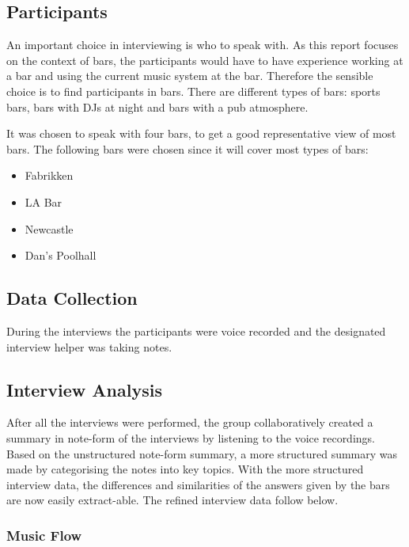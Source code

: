 \subsection{Participants}

An important choice in interviewing is who to speak with. As this report focuses on the context of bars, the participants would have to have experience working at a bar and using the current music system at the bar. Therefore the sensible choice is to find participants in bars. There are different types of bars: sports bars, bars with DJs at night and bars with a pub atmosphere.

It was chosen to speak with four bars, to get a good representative view of most bars. The following bars were chosen since it will cover most types of bars:

\begin{itemize}
  \item Fabrikken
  \item LA Bar
  \item Newcastle
  \item Dan's Poolhall
\end{itemize}

\subsection{Data Collection}
\label{sub:data_collection}

During the interviews the participants were voice recorded and the designated interview helper was taking notes.

\subsection{Interview Analysis}
\label{sub:interview_analysis}

After all the interviews were performed, the group collaboratively created a summary in note-form of the interviews by listening to the voice recordings. Based on the unstructured note-form summary, a more structured summary was made by categorising the notes into key topics. With the more structured interview data, the differences and similarities of the answers given by the bars are now easily extract-able. The refined interview data follow below.

\subsubsection{Music Flow}
\label{ssub:Music Flow}

